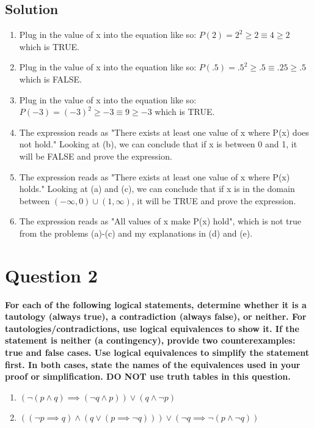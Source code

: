 \documentclass[11pt]{article}
\begin{document}
    \subsection*{Solution}
    \begin{enumerate}[label=(\alph*)]
        \item Plug in the value of x into the equation like so: \(P(2) = 2^2 \geq 2 \equiv 4 \geq 2\) which is TRUE.
        \item Plug in the value of x into the equation like so: \(P(.5) = .5^2 \geq .5 \equiv .25 \geq .5\) which is FALSE.
        \item Plug in the value of x into the equation like so: \(P(-3) = (-3)^2 \geq -3 \equiv 9 \geq -3\) which is TRUE.
        \item The expression reads as "There exists at least one value of x where P(x) does not hold." Looking at (b), we can conclude that if x is between 0 and 1, it will be FALSE and prove the expression.
        \item The expression reads as "There exists at least one value of x where P(x) holds." Looking at (a) and (c), we can conclude that if x is in the domain between \((-\infty,0) \cup (1, \infty)\), it will be TRUE and prove the expression.
        \item The expression reads as "All values of x make P(x) hold", which is not true from the problems (a)-(c) and my explanations in (d) and (e).
    \end{enumerate}


\clearpage
\section*{Question 2}
    \textbf{For each of the following logical statements, determine whether it is a tautology (always true), a contradiction (always false), or neither. For tautologies/contradictions, use logical equivalences to show it. If the statement is neither (a contingency), provide two counterexamples: true and false cases. Use logical equivalences to simplify the statement first. In both cases, state the names of the equivalences used in your proof or simplification. DO NOT use truth tables in this question.}
    \begin{enumerate}[label=(\alph*)]
        \item \((\neg(p\land q) \implies (\neg q \land p)) \lor (q \land \neg p)\)
        \item \(((\neg p \implies q) \land (q \lor (p \implies \neg q))) \lor (\neg q \implies \neg (p \land \neg q))\)
    \end{enumerate}
\end{document}
